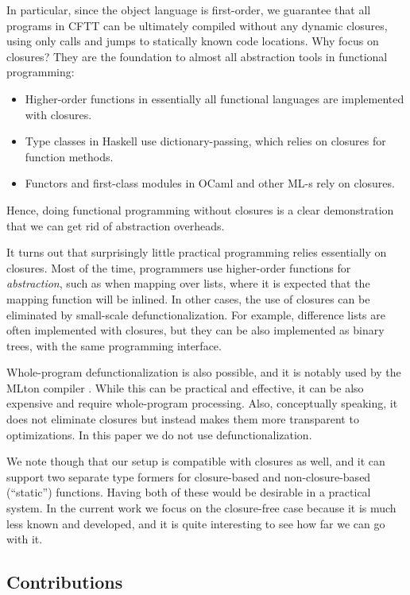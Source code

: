 \documentclass[acmsmall,screen,review,anonymous]{acmart}
\theoremstyle{remark}
\begin{document}
In particular, since the object language is first-order, we guarantee that all
programs in CFTT can be ultimately compiled without any dynamic closures, using
only calls and jumps to statically known code locations. Why focus on closures?
They are the foundation to almost all abstraction tools in functional
programming:
\begin{itemize}
\item Higher-order functions in essentially all functional languages are implemented with closures.
\item Type classes in Haskell use dictionary-passing, which relies on closures for function methods.
\item Functors and first-class modules in OCaml and other ML-s rely on closures.
\end{itemize}
Hence, doing functional programming without closures is a clear demonstration
that we can get rid of abstraction overheads.

It turns out that surprisingly little practical programming relies essentially
on closures. Most of the time, programmers use higher-order functions for
\emph{abstraction}, such as when mapping over lists, where it is expected that
the mapping function will be inlined. In other cases, the use of closures can be
eliminated by small-scale defunctionalization. For example, difference lists
\cite{TODO} are often implemented with closures, but they can be also
implemented as binary trees, with the same programming interface.


Whole-program defunctionalization is also possible, and it is notably used by
the MLton compiler \cite{TODO}. While this can be practical and effective, it
can be also expensive and require whole-program processing. Also, conceptually
speaking, it does not eliminate closures but instead makes them more transparent
to optimizations. In this paper we do not use defunctionalization.

We note though that our setup is compatible with closures as well, and it can
support two separate type formers for closure-based and non-closure-based
(``static'') functions. Having both of these would be desirable in a practical
system. In the current work we focus on the closure-free case because it is much
less known and developed, and it is quite interesting to see how far we
can go with it.

\subsection{Contributions}
\end{document}
